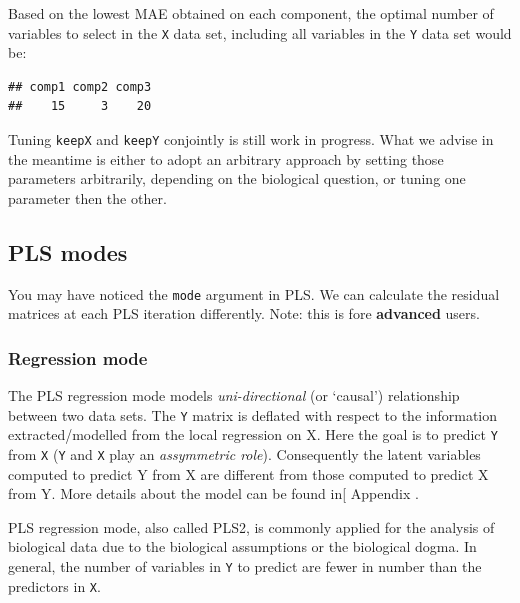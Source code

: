 \documentclass[]{book}
\newenvironment{Shaded}{\begin{snugshade}}{\end{snugshade}}
\newcommand{\NormalTok}[1]{#1}
\newcommand{\OperatorTok}[1]{\textcolor[rgb]{0.81,0.36,0.00}{\textbf{#1}}}
\begin{document}
Based on the lowest MAE obtained on each component, the optimal number of variables to select in the \texttt{X} data set, including all variables in the \texttt{Y} data set would be:

\begin{Shaded}
\end{Shaded}

\begin{verbatim}
## comp1 comp2 comp3 
##    15     3    20
\end{verbatim}

Tuning \texttt{keepX} and \texttt{keepY} conjointly is still work in progress. What we advise in the meantime is either to adopt an arbitrary approach by setting those parameters arbitrarily, depending on the biological question, or tuning one parameter then the other.

\hypertarget{PLS:details}{%
\subsection{PLS modes}\label{PLS:details}}

You may have noticed the \texttt{mode} argument in PLS. We can calculate the residual matrices at each PLS iteration differently. Note: this is fore \textbf{advanced} users.

\hypertarget{regression-mode}{%
\subsubsection{Regression mode}\label{regression-mode}}

The PLS regression mode models \emph{uni-directional} (or `causal') relationship between two data sets. The \texttt{Y} matrix is deflated with respect to the information extracted/modelled from the local regression on X. Here the goal is to predict \texttt{Y} from \texttt{X} (\texttt{Y} and \texttt{X} play an \emph{assymmetric role}). Consequently the latent variables computed to predict Y from X are different from those computed to predict X from Y. More details about the model can be found in{[} Appendix \citep{Lec08}.

PLS regression mode, also called PLS2, is commonly applied for the analysis of biological data \citep{Bou05, Byl07} due to the biological assumptions or the biological dogma. In general, the number of variables in \texttt{Y} to predict are fewer in number than the predictors in \texttt{X}.
\end{document}
